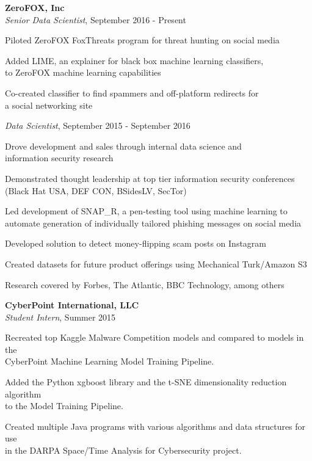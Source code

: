 \medskip
\atab \textbf{ZeroFOX, Inc}\\
\btab \textit{Senior Data Scientist}, September 2016 - Present\\
\begin{my_list}
\item Piloted ZeroFOX FoxThreats program for threat hunting on social media
\item Added LIME, an explainer for black box machine learning classifiers,\\ \tab \tab to ZeroFOX machine learning capabilities
\item Co-created classifier to find spammers and off-platform redirects for\\ \tab \tab a social networking site
\end{my_list}
\btab \textit{Data Scientist}, September 2015 - September 2016\\
\begin{my_list}
\item Drove development and sales through internal data science and\\ \tab \tab information security research
\item Demonstrated thought leadership at top tier information security conferences\\ \tab \tab (Black Hat USA, DEF CON, BSidesLV, SecTor)
\item Led development of SNAP\_R, a pen-testing tool using machine learning to\\ \tab \tab automate generation of individually tailored phishing messages on social media
\item Developed solution to detect money-flipping scam posts on Instagram
\item Created datasets for future product offerings using Mechanical Turk/Amazon S3 
\item Research covered by Forbes, The Atlantic, BBC Technology, among others
\end{my_list}

\medskip
\atab \textbf{CyberPoint International, LLC}\\
\btab \textit{Student Intern}, Summer 2015\\
\begin{my_list}
\item Recreated top Kaggle Malware Competition models and compared to models in the\\ \tab \tab CyberPoint Machine Learning Model Training Pipeline.
\item Added the Python xgboost library and the t-SNE dimensionality reduction algorithm\\ \tab \tab to the Model Training Pipeline.
\item Created multiple Java programs with various algorithms and data structures for use\\ \tab \tab in the DARPA Space/Time Analysis for Cybersecurity project.
\end{my_list}

